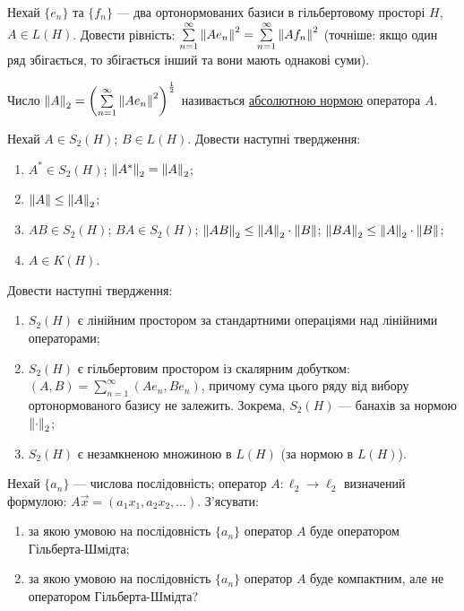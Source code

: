 
\begin{exercise}
    Нехай $\{e_n\}$ та $\{f_n\}$ --- два ортонормованих базиси в гільбертовому просторі $H$, 
    $A \in L(H)$. Довести рівність: 
    $\sum\limits_{n = 1}^\infty \left\lVert A e_n\right\rVert^2 = \sum\limits_{n = 1}^\infty \left\lVert A f_n\right\rVert^2$ (точніше: якщо
    один ряд збігається, то збігається інший та вони мають однакові суми).
\end{exercise}

\begin{theory}
    Число $\left\lVert A\right\rVert_2 = \left(\sum\limits_{n = 1}^\infty \left\lVert A e_n\right\rVert^2\right)^{\frac{1}{2}}$ називається
    \underline{абсолютною нормою} оператора $A$.
\end{theory}

\begin{exercise}
    Нехай $A \in S_2 (H)$; $B \in L(H)$. Довести наступні твердження:
    \begin{enumerate}
        \item $A^* \in S_2 (H)$; $\left\lVert A^*\right\rVert_2 = \left\lVert A\right\rVert_2$;
        \item $\left\lVert A\right\rVert \leq \left\lVert A\right\rVert_2$;
        \item $AB \in S_2 (H)$; $BA \in S_2 (H)$; $\left\lVert AB\right\rVert_2 \leq \left\lVert A\right\rVert_2 \cdot \left\lVert B\right\rVert$; 
        $\left\lVert BA\right\rVert_2 \leq \left\lVert A\right\rVert_2 \cdot \left\lVert B\right\rVert$;
        \item $A \in K(H)$.
    \end{enumerate}
\end{exercise}

\begin{exercise}
    Довести наступні твердження:
    \begin{enumerate}
        \item $S_2(H)$ є лінійним простором за стандартними операціями над лінійними операторами; 
        \item $S_2(H)$ є гільбертовим простором із скалярним добутком: 
        $(A, B) = \sum\limits_{n = 1}^\infty \left(A e_n, B e_n\right)$, причому сума цього ряду від вибору
        ортонормованого базису не залежить. Зокрема, $S_2(H)$ --- банахів за нормою $\left\lVert\cdot\right\rVert_2$;
        \item $S_2(H)$ є незамкненою множиною в $L(H)$ (за нормою в $L(H)$).
    \end{enumerate}
\end{exercise}

\begin{exercise}\label{N:1_5_42}
    Нехай $\{a_n\}$ --- числова послідовність; оператор $A:\ell_2 \rightarrow \ell_2$ визначений формулою:
    $A \vec{x} = \left(a_1 x_1, a_2 x_2, \dots \right)$. З'ясувати:
    \begin{enumerate}
        \item за якою умовою на послідовність $\{a_n\}$ оператор $A$ буде оператором Гільберта-Шмідта;
        \item за якою умовою на послідовність $\{a_n\}$ оператор $A$ буде компактним, але не оператором Гільберта-Шмідта?
    \end{enumerate}
\end{exercise}

